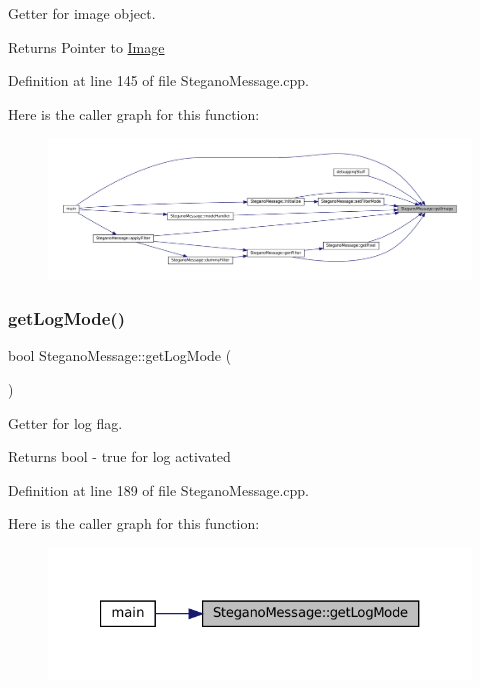 Getter for image object. 

\begin{DoxyReturn}{Returns}
Pointer to \mbox{\hyperlink{classImage}{Image}} 
\end{DoxyReturn}


Definition at line 145 of file Stegano\+Message.\+cpp.

Here is the caller graph for this function\+:\nopagebreak
\begin{figure}[H]
\begin{center}
\leavevmode
\includegraphics[width=350pt]{classSteganoMessage_a2e3ad705a0219edfd2150f3f7931979c_icgraph}
\end{center}
\end{figure}
\mbox{\label{classSteganoMessage_ab560ec6c0d3e99c19822ca1119a68b92}} 
\subsubsection{\texorpdfstring{getLogMode()}{getLogMode()}}
{\footnotesize\ttfamily bool Stegano\+Message\+::get\+Log\+Mode (\begin{DoxyParamCaption}{ }\end{DoxyParamCaption})}



Getter for log flag. 

\begin{DoxyReturn}{Returns}
bool -\/ true for log activated 
\end{DoxyReturn}


Definition at line 189 of file Stegano\+Message.\+cpp.

Here is the caller graph for this function\+:\nopagebreak
\begin{figure}[H]
\begin{center}
\leavevmode
\includegraphics[width=321pt]{classSteganoMessage_ab560ec6c0d3e99c19822ca1119a68b92_icgraph}
\end{center}
\end{figure}
\mbox{\label{classSteganoMessage_ad29978e925056ad70dc5c45b1e1681eb}} 
